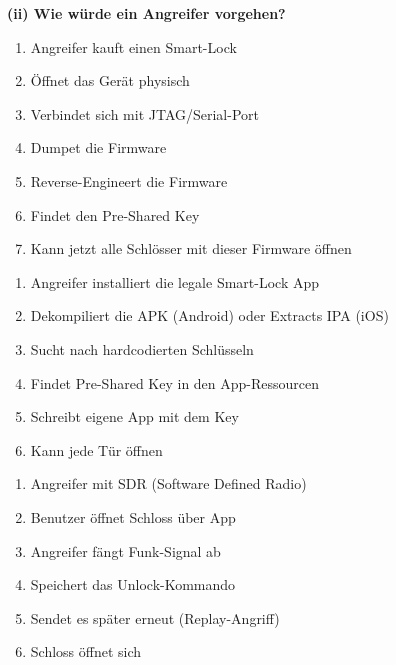 \documentclass[12pt,a4paper]{article}
\begin{document}
\begin{tcolorbox}[colback=solutionbg, colframe=black!30]

\textbf{(ii) Wie würde ein Angreifer vorgehen?} \checkmark

\begin{enumerate}
    \item Angreifer kauft einen Smart-Lock
    \item Öffnet das Gerät physisch
    \item Verbindet sich mit JTAG/Serial-Port
    \item Dumpet die Firmware
    \item Reverse-Engineert die Firmware
    \item Findet den Pre-Shared Key
    \item Kann jetzt alle Schlösser mit dieser Firmware öffnen
\end{enumerate}

\begin{enumerate}
    \item Angreifer installiert die legale Smart-Lock App
    \item Dekompiliert die APK (Android) oder Extracts IPA (iOS)
    \item Sucht nach hardcodierten Schlüsseln
    \item Findet Pre-Shared Key in den App-Ressourcen
    \item Schreibt eigene App mit dem Key
    \item Kann jede Tür öffnen
\end{enumerate}

\begin{enumerate}
    \item Angreifer mit SDR (Software Defined Radio)
    \item Benutzer öffnet Schloss über App
    \item Angreifer fängt Funk-Signal ab
    \item Speichert das Unlock-Kommando
    \item Sendet es später erneut (Replay-Angriff)
    \item Schloss öffnet sich
\end{enumerate}

\end{tcolorbox}
\end{document}
